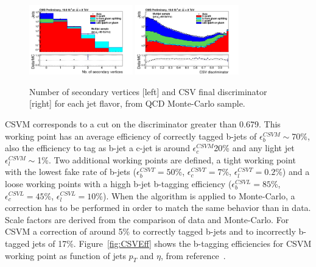 \begin{figure}[!Hhtbp]
  \begin{center}
    \includegraphics[width=0.4\textwidth]{figs/sv_multi_0_Log.png}
    \includegraphics[width=0.4\textwidth]{figs/pdf-sub.png}
    \caption{Number of secondary vertices [left] and CSV final discriminator [right] for each jet flavor, from QCD Monte-Carlo sample.}
    \label{fig:CSVVar}
  \end{center}
\end{figure}

CSVM corresponds to a cut on the discriminator greater than 0.679. This working point has an average efficiency of correctly tagged b-jets of $\epsilon^{CSVM}_{b}\sim$70\%, also the efficiency to tag as b-jet a c-jet is around $\epsilon^{CSVM}_{c}$20\% and any light jet $\epsilon^{CSVM}_{l}\sim$1\%. Two additional working points are defined, a tight working point with the lowest fake rate of b-jets ($\epsilon^{CSVT}_{b}=50$\%, $\epsilon^{CSVT}_{c}=7$\%, $\epsilon^{CSVT}_{l}=0.2$\%) and a loose working points with a higgh b-jet b-tagging efficiency ($\epsilon^{CSVL}_{b}=85$\%, $\epsilon^{CSVL}_{c}=45$\%, $\epsilon^{CSVL}_{l}=10$\%). When the algorithm is applied to Monte-Carlo, a correction has to be performed in order to match the same behavior than in data. Scale factors are derived from the comparison of data and Monte-Carlo. For CSVM a correction of around 5\% to correctly tagged b-jets and to incorrectly b-tagged jets of 17\%. Figure~\ref{fig:CSVEff} shows the b-tagging efficiencies for CSVM working point as function of jets $p_{T}$ and $\eta$, from reference~\cite{CMS-PAS-BTV-13-001}.  

